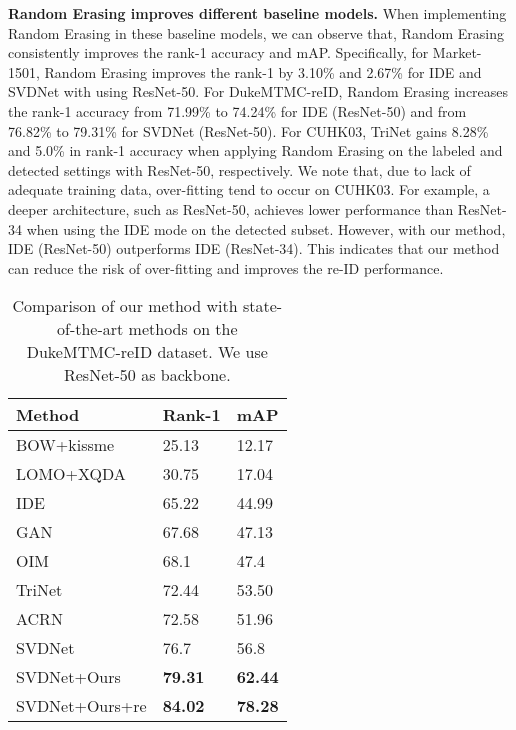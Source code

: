 \documentclass[10pt,twocolumn,letterpaper]{article}
\begin{document}
\textbf{Random Erasing improves different baseline models.} When implementing Random Erasing in these baseline models, we can observe that, Random Erasing consistently improves the rank-1 accuracy and mAP. Specifically, for Market-1501, Random Erasing improves the rank-1 by 3.10\% and 2.67\% for IDE and SVDNet with using ResNet-50. For DukeMTMC-reID, Random Erasing increases the rank-1 accuracy from 71.99\% to 74.24\% for IDE (ResNet-50) and from 76.82\% to 79.31\% for SVDNet (ResNet-50). For CUHK03, TriNet gains 8.28\% and 5.0\% in rank-1 accuracy when applying Random Erasing on the labeled and detected settings with ResNet-50, respectively. We note that, due to lack of adequate training data, over-fitting tend to occur on CUHK03. For example,  a deeper architecture, such as ResNet-50,  achieves lower performance than ResNet-34 when using the IDE mode on the detected subset. However, with our method, IDE (ResNet-50) outperforms IDE (ResNet-34). This indicates that our method can reduce the risk of over-fitting and improves the re-ID performance.



\begin{table}
\small
\begin{center}
\begin{tabularx}{\linewidth}{ l|C|C }
\hline
Method & Rank-1 & mAP \\
\hline
\hline
{BOW}+kissme  \cite{zheng2015scalable}  & 25.13 & 12.17 \\
LOMO+XQDA \cite{liao2015lomo} & 30.75 & 17.04  \\ 
IDE \cite{reid-survey} & 65.22 & 44.99 \\
{GAN} \cite{zheng2017unlabeled} & 67.68 & 47.13 \\
OIM \cite{xiao2017oim} & 68.1 & 47.4 \\
TriNet \cite{hermans2017defense} & 72.44 & 53.50 \\ 	ACRN \cite{schumann2017person} & 72.58 & 51.96\\
SVDNet \cite{sun2017svdnet} & 76.7 & 56.8 \\
\hline 
\hline
SVDNet+Ours & \textbf{79.31} & \textbf{62.44} \\
SVDNet+Ours+re \cite{zhong2017re}& \textbf{84.02}& \textbf{78.28} \\
\hline
\end{tabularx}
\end{center}
\vspace{-.1in}
\caption{\label{tabel:duke-state} Comparison of our method with state-of-the-art methods on the DukeMTMC-reID dataset. We use ResNet-50 as backbone.}
\end{table}
\end{document}
